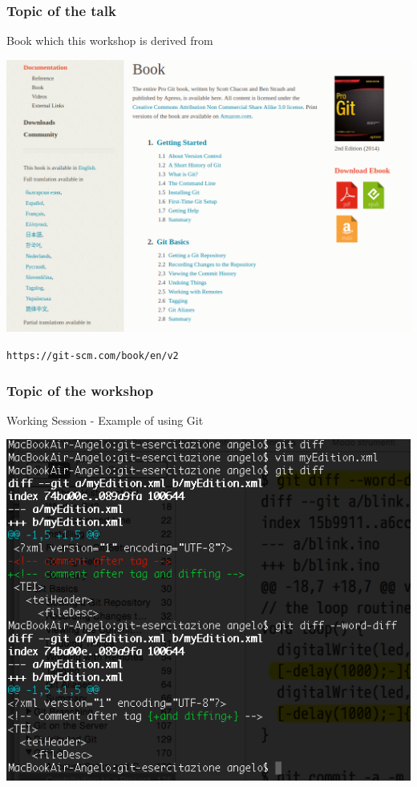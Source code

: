 \documentclass{beamer}
\begin{document}
\begin{frame}
	\frametitle{Topic of the talk}
	\addtocounter{nframe}{1}

	\begin{block}{Book which this workshop is derived from}
		\begin{center}
			\includegraphics[width=.7\textwidth]{./imgs/GIT-BOOK.png}
		\end{center}
	\end{block}

	\texttt{https://git-scm.com/book/en/v2}
	
\end{frame}

\begin{frame}
	\frametitle{Topic of the workshop}
	\addtocounter{nframe}{1}

	\begin{block}{Working Session - Example of using Git}
		\begin{center}
			\includegraphics[width=.7\textwidth]{./imgs/Diffing-line-word.png}
		\end{center}
	\end{block}

\end{frame}
\end{document}

